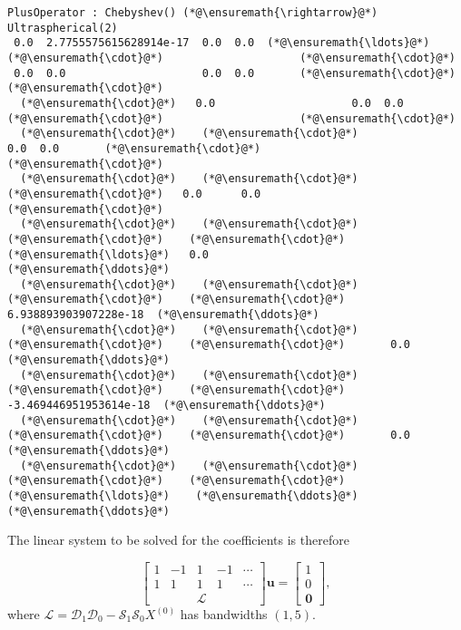 \documentclass[12pt,landscape]{article}
\begin{document}
{\begin{lstlisting}
PlusOperator : Chebyshev() (*@\ensuremath{\rightarrow}@*) Ultraspherical(2)
 0.0  2.7755575615628914e-17  0.0  0.0  (*@\ensuremath{\ldots}@*)    (*@\ensuremath{\cdot}@*)                     (*@\ensuremath{\cdot}@*)
 0.0  0.0                     0.0  0.0       (*@\ensuremath{\cdot}@*)                     (*@\ensuremath{\cdot}@*)
  (*@\ensuremath{\cdot}@*)   0.0                     0.0  0.0       (*@\ensuremath{\cdot}@*)                     (*@\ensuremath{\cdot}@*)
  (*@\ensuremath{\cdot}@*)    (*@\ensuremath{\cdot}@*)                      0.0  0.0       (*@\ensuremath{\cdot}@*)                     (*@\ensuremath{\cdot}@*)
  (*@\ensuremath{\cdot}@*)    (*@\ensuremath{\cdot}@*)                       (*@\ensuremath{\cdot}@*)   0.0      0.0                    (*@\ensuremath{\cdot}@*)
  (*@\ensuremath{\cdot}@*)    (*@\ensuremath{\cdot}@*)                       (*@\ensuremath{\cdot}@*)    (*@\ensuremath{\cdot}@*)   (*@\ensuremath{\ldots}@*)   0.0                    (*@\ensuremath{\ddots}@*)
  (*@\ensuremath{\cdot}@*)    (*@\ensuremath{\cdot}@*)                       (*@\ensuremath{\cdot}@*)    (*@\ensuremath{\cdot}@*)       6.938893903907228e-18  (*@\ensuremath{\ddots}@*)
  (*@\ensuremath{\cdot}@*)    (*@\ensuremath{\cdot}@*)                       (*@\ensuremath{\cdot}@*)    (*@\ensuremath{\cdot}@*)       0.0                    (*@\ensuremath{\ddots}@*)
  (*@\ensuremath{\cdot}@*)    (*@\ensuremath{\cdot}@*)                       (*@\ensuremath{\cdot}@*)    (*@\ensuremath{\cdot}@*)      -3.469446951953614e-18  (*@\ensuremath{\ddots}@*)
  (*@\ensuremath{\cdot}@*)    (*@\ensuremath{\cdot}@*)                       (*@\ensuremath{\cdot}@*)    (*@\ensuremath{\cdot}@*)       0.0                    (*@\ensuremath{\ddots}@*)
  (*@\ensuremath{\cdot}@*)    (*@\ensuremath{\cdot}@*)                       (*@\ensuremath{\cdot}@*)    (*@\ensuremath{\cdot}@*)   (*@\ensuremath{\ldots}@*)    (*@\ensuremath{\ddots}@*)                     (*@\ensuremath{\ddots}@*)
\end{lstlisting}


The linear system to be solved for the coefficients is therefore

\[
\begin{bmatrix}
1 & -1 &  1 & -1 & \cdots  \\
1 & 1  &  1 & 1  & \cdots \\
& &\mathcal{L} & &
\end{bmatrix}\mathbf{u} = \begin{bmatrix} 1  \\
0 \\
\mathbf{0}
\end{bmatrix},
\]
where $\mathcal{L} = \mathcal{D}_1\mathcal{D}_0  - \mathcal{S}_1\mathcal{S}_0X^{(0)} $ has bandwidths $(1,5)$.


}
\end{document}
